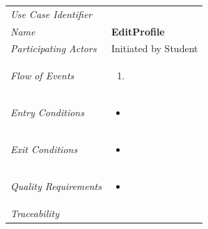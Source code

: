 \documentclass[12pt,letterpaper]{article}
\begin{document}
\begin{center}
	\begin{tabu} to 
		\toprule
		Use Case Identifier & \editprofile{} \\
		Name & {\bf EditProfile} \\
		Participating Actors & Initiated by Student \\
		Flow of Events & 
	    \begin{enumerate}[topsep=-1em, leftmargin=*]
		    \item 
		\end{enumerate} \\

		Entry Conditions &
		\begin{itemize}[topsep=-1em, leftmargin=*]
		    \item 
        \end{itemize} \\

		Exit Conditions &
		\begin{itemize}[topsep=-1em, leftmargin=*]
		    \item 
        \end{itemize} \\

		Quality Requirements &
		\begin{itemize}[topsep=-1em, leftmargin=*]
		    \item 
        \end{itemize} \\

		Traceability &  \\
		\toprule
	\end{tabu}
\end{center}
\end{document}
